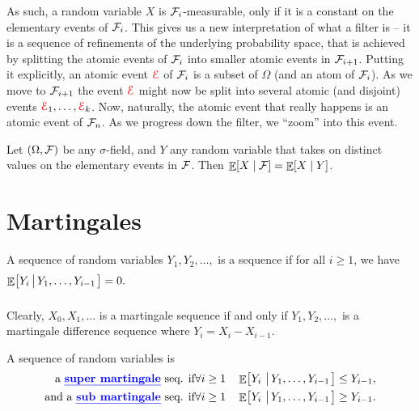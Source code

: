 As such, a random variable $X$ is $\mathcal{F}_i$-measurable, only if it is a
constant on the elementary events of $\mathcal{F}_i$.  This gives us a new
interpretation of what a filter is -- it is a sequence of refinements of
the underlying probability space, that is achieved by splitting the
atomic events of $\mathcal{F}_i$ into smaller atomic events in
$\mathcal{F}_{i+1}$.  Putting it explicitly, an atomic event ${\textcolor{red}{\EuScript{E}}}$ of
$\mathcal{F}_i$ is a subset of $\Omega$ (and an atom of $\mathcal{F}_i$).  As we move
to $\mathcal{F}_{i+1}$ the event ${\textcolor{red}{\EuScript{E}}}$ might now be split into several
atomic (and disjoint) events ${\textcolor{red}{\EuScript{E}}}_1, \ldots, {\textcolor{red}{\EuScript{E}}}_k$. Now, naturally, the
atomic event that really happens is an atomic event of $\mathcal{F}_n$. As we
progress down the filter, we ``zoom'' into this event.



\begin{defn}
    Let $(\Omega, \mathcal{F})$ be any $\sigma$-field, and $Y$ any random
    variable that takes on distinct values on the elementary events in
    $\mathcal{F}$. Then $\mathop{\mathbb{E}}\!\left[  X  \;\middle\vert\;  \mathcal{F}  \right] = \mathop{\mathbb{E}}\!\left[  X  \;\middle\vert\;  Y  \right]$.
\end{defn}


\section{Martingales}


\begin{defn}
    A sequence of random variables $Y_1, Y_2, \ldots,$ is a
    sequence if for all $i \geq 1$, we have
    \begin{math}
        \biggl.\mathop{\mathbb{E}}\!\left[ { Y_i \left|\, { \bigl. Y_1,\ldots, Y_{i-1}} \right.} \right] = 0.
    \end{math}
\end{defn}

Clearly, $X_0, X_1, \ldots$ is a martingale sequence if and only if
$Y_1, Y_2, \ldots,$ is a martingale difference sequence where
$Y_i = X_i - X_{i-1}$.

\begin{defn}
    A sequence of random variables  is
    \begin{align*}
        \text{ a \emphOnly{super martingale}\index{super martingale} seq. if} &
        \forall i \geq 1 \quad%
        \Ex{ Y_i \sep{ Y_1,\ldots, Y_{i-1}}} \leq Y_{i-1},\\
        \text{and a \emphOnly{sub martingale}\index{sub martingale} seq. if} &%
        \forall i \geq 1 \quad%
        \Ex{ Y_i \sep{ Y_1,\ldots, Y_{i-1}}} \geq Y_{i-1}.
    \end{align*}
\end{defn}


